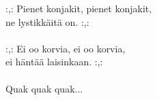 
            :,: Pienet konjakit, pienet konjakit, \\
            ne lystikkäitä on. :,: \\
\hspace{10mm} \\
            :,: Ei oo korvia, ei oo korvia, \\
            ei häntää laisinkaan. :,: \\
\hspace{10mm} \\
            Quak quak quak... \\
